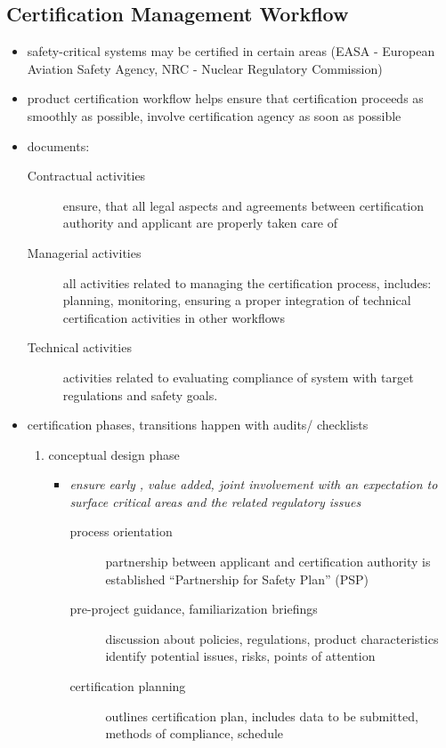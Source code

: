 \documentclass[a4paper, 10pt]{article}
\begin{document}
\subsection*{Certification Management Workflow}
\begin{itemize}
    \item safety-critical systems may be certified in certain areas (EASA - European Aviation Safety Agency, NRC - Nuclear Regulatory Commission)
    \item product certification workflow helps ensure that certification proceeds as smoothly as possible, involve certification agency as soon as possible
    \item documents:
    \begin{description}
        \item[Contractual activities] ensure, that all legal aspects and agreements between certification authority and applicant are properly taken care of
        \item[Managerial activities] all activities related to managing the certification process, includes: planning, monitoring, ensuring a proper integration of technical certification activities in other workflows
        \item[Technical activities] activities related to evaluating compliance of system with target regulations and safety goals.
    \end{description}
    \item certification phases, transitions happen with audits/ checklists
    \begin{enumerate}
        \item conceptual design phase
        \begin{itemize}
            \item \emph{ensure early , value added, joint involvement with an expectation to surface critical areas and the related regulatory issues}
            \begin{description}
                \item[process orientation]  partnership between applicant and certification authority is established \follows ``Partnership for Safety Plan'' (PSP)
                \item[pre-project guidance, familiarization briefings] discussion about policies, regulations, product characteristics \follows identify potential issues, risks, points of attention
                \item[certification planning] outlines certification plan, includes data to be submitted, methods of compliance, schedule

\end{description}
\end{itemize}
\end{enumerate}
\end{itemize}
\end{document}
